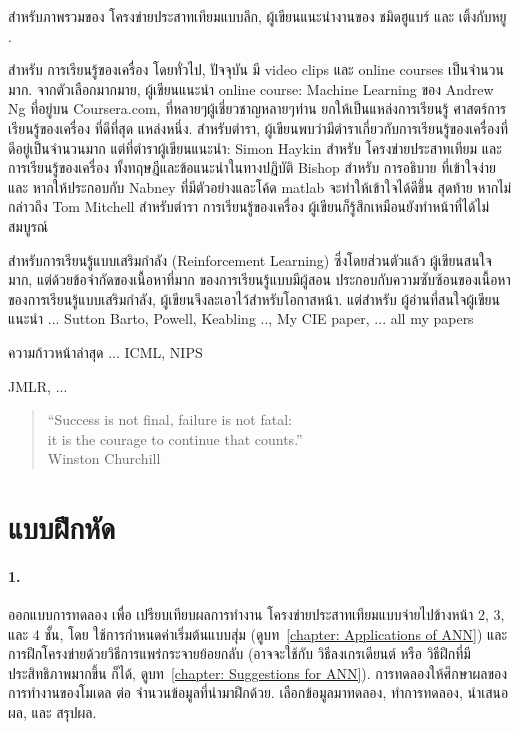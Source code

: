 สำหรับภาพรวมของ โครงข่ายประสาทเทียมแบบลึก, ผู้เขียนแนะนำงานของ ชมิดฮูแบร์ และ เติ้งกับหยู \cite{Schmidhuber2015a, DengYu2014a}.

สำหรับ การเรียนรู้ของเครื่อง โดยทั่วไป, 
ปัจจุบัน มี video clips และ online courses เป็นจำนวนมาก.
จากตัวเลือกมากมาย, ผู้เขียนแนะนำ online course: Machine Learning ของ Andrew Ng ที่อยู่บน Coursera.com, ที่หลายๆผู้เชี่ยวชาญหลายๆท่าน ยกให้เป็นแหล่งการเรียนรู้ ศาสตร์การเรียนรู้ของเครื่อง ที่ดีที่สุด แหล่งหนึ่ง.
สำหรับตำรา, ผู้เขียนพบว่ามีตำราเกี่ยวกับการเรียนรู้ของเครื่องที่ดีอยู่เป็นจำนวนมาก แต่ที่ตำราผู้เขียนแนะนำ:
Simon Haykin สำหรับ โครงข่ายประสาทเทียม และ การเรียนรู้ของเครื่อง ทั้งทฤษฎีและข้อแนะนำในทางปฏิบัติ
Bishop สำหรับ การอธิบาย ที่เข้าใจง่าย และ หากให้ประกอบกับ Nabney ที่มีตัวอย่างและโค้ด matlab จะทำให้เข้าใจได้ดีขึ้น
สุดท้าย หากไม่กล่าวถึง Tom Mitchell สำหรับตำรา การเรียนรู้ของเครื่อง ผู้เขียนก็รู้สึกเหมือนยังทำหน้าที่ได้ไม่สมบูรณ์

สำหรับการเรียนรู้แบบเสริมกำลัง (Reinforcement Learning) ซึ่งโดยส่วนตัวแล้ว ผู้เขียนสนใจมาก,
 แต่ด้วยข้อจำกัดของเนื้อหาที่มาก ของการเรียนรู้แบบมีผู้สอน ประกอบกับความซับซ้อนของเนื้อหาของการเรียนรู้แบบเสริมกำลัง, 
ผู้เขียนจึงละเอาไว้สำหรับโอกาสหน้า.
แต่สำหรับ ผู้อ่านที่สนใจผู้เขียนแนะนำ
... Sutton Barto, Powell, Keabling .., My CIE paper, ... all my papers

ความก้าวหน้าล่าสุด ... ICML, NIPS

JMLR, ...

\begin{verse}
``Success is not final, failure is not fatal: \\
it is the courage to continue that counts.'' \\
Winston Churchill
\end{verse}

\section{แบบฝึกหัด}
\label{section: Deep exercises}

\paragraph{1.} 
ออกแบบการทดลอง เพื่อ เปรียบเทียบผลการทำงาน โครงข่ายประสาทเทียมแบบจ่ายไปข้างหน้า $2$, $3$, และ $4$ ชั้น, โดย ใช้การกำหนดค่าเริ่มต้นแบบสุ่ม (ดูบท~\ref{chapter: Applications of ANN}) และ การฝึกโครงข่ายด้วยวิธีการแพร่กระจายย้อยกลับ (อาจจะใช้กับ วิธีลงเกรเดียนต์ หรือ วิธีฝึกที่มีประสิทธิภาพมากขึ้น ก็ได้, ดูบท~\ref{chapter: Suggestions for ANN}).
การทดลองให้ศึกษาผลของการทำงานของโมเดล ต่อ จำนวนข้อมูลที่นำมาฝึกด้วย.
เลือกข้อมูลมาทดลอง, ทำการทดลอง, นำเสนอผล, และ สรุปผล.

